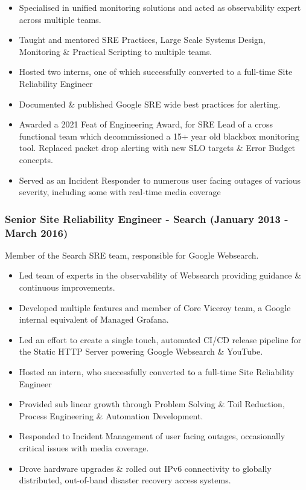 \documentclass[a4paper, 10pt] {article}
\begin{document}
\begin{itemize}[noitemsep]
	\item Specialised in unified monitoring solutions and acted as observability expert across multiple teams.
	\item Taught and mentored SRE Practices, Large Scale Systems Design, Monitoring \& Practical Scripting to multiple teams.
 	\item Hosted two interns, one of which successfully converted to a full-time Site Reliability Engineer
	\item Documented \& published Google SRE wide best practices for alerting.
	\item Awarded a 2021 Feat of Engineering Award, for SRE Lead of a cross functional team which decommissioned a 15+ year old blackbox
		monitoring tool. Replaced packet drop alerting with new SLO targets \& Error Budget concepts.
	\item Served as an Incident Responder to numerous user facing outages of various severity, including some with real-time media coverage
\end{itemize}

\subsubsection*{Senior Site Reliability Engineer - Search (January 2013 - March 2016)}

Member of the Search SRE team, responsible for Google Websearch.

\begin{itemize}[noitemsep]
	\item Led team of experts in the observability of Websearch providing guidance \& continuous improvements.
	\item Developed multiple features and member of Core Viceroy team, a Google internal equivalent of Managed Grafana.
  	\item Led an effort to create a single touch, automated CI/CD release pipeline for the Static HTTP Server powering Google Websearch \& YouTube.
   	\item Hosted an intern, who successfully converted to a full-time Site Reliability Engineer
	\item Provided sub linear growth through Problem Solving \& Toil Reduction, Process Engineering \& Automation Development.
	\item Responded to Incident Management of user facing outages, occasionally critical issues with media coverage.
 	\item Drove hardware upgrades \& rolled out IPv6 connectivity to globally distributed, out-of-band disaster recovery access systems.
\end{itemize}
\end{document}
